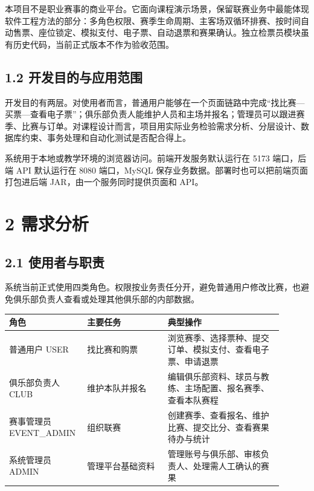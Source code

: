 \documentclass[UTF8,zihao=-4,a4paper]{ctexart}
\begin{document}
本项目不是职业赛事的商业平台。它面向课程演示场景，保留联赛业务中最能体现软件工程方法的部分：多角色权限、赛季生命周期、主客场双循环排赛、按时间自动售票、座位锁定、模拟支付、电子票、自动退票和赛果确认。独立检票员模块虽有历史代码，当前正式版本不作为验收范围。


\subsection*{1.2 开发目的与应用范围}

开发目的有两层。对使用者而言，普通用户能够在一个页面链路中完成“找比赛—买票—查看电子票”；俱乐部负责人能维护人员和主场并报名；管理员可以跟进赛季、比赛与订单。对课程设计而言，项目用实际业务检验需求分析、分层设计、数据库约束、事务处理和自动化测试是否配合得上。


系统用于本地或教学环境的浏览器访问。前端开发服务默认运行在 5173 端口，后端 API 默认运行在 8080 端口，MySQL 保存业务数据。部署时也可以把前端页面打包进后端 JAR，由一个服务同时提供页面和 API。


\section*{2 需求分析}

\subsection*{2.1 使用者与职责}

系统当前正式使用四类角色。权限按业务责任分开，避免普通用户修改比赛，也避免俱乐部负责人查看或处理其他俱乐部的内部数据。


\begin{longtable}{@{}>{\raggedright\arraybackslash}p{0.22\linewidth}>{\raggedright\arraybackslash}p{0.28\linewidth}>{\raggedright\arraybackslash}p{0.4\linewidth}@{}}\toprule

\textbf{角色} & \textbf{主要任务} & \textbf{典型操作} \\\midrule

普通用户 USER & 找比赛和购票 & 浏览赛季、选择票种、提交订单、模拟支付、查看电子票、申请退票 \\

俱乐部负责人 CLUB & 维护本队并报名 & 编辑俱乐部资料、球员与教练、主场配置、报名赛季、查看本队赛程 \\

赛事管理员 EVENT\_\allowbreak{}ADMIN & 组织联赛 & 创建赛季、查看报名、维护比赛、提交比分、查看赛果待办与统计 \\

系统管理员 ADMIN & 管理平台基础资料 & 管理账号与俱乐部、审核负责人、处理需人工确认的赛果 \\

\bottomrule\end{longtable}
\end{document}

